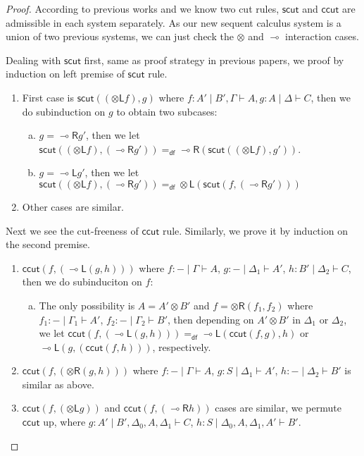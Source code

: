 \documentclass{article}
\newtheorem*{proof}{Proof : }
\newcommand{\tl}{\otimes \mathsf{L}}
\newcommand{\tr}{\otimes \mathsf{R}}
\newcommand{\lright}{\multimap \mathsf{R}}
\newcommand{\lleft}{\multimap \mathsf{L}}
\newcommand{\ot}{\otimes}
\newcommand{\lolli}{\multimap}
\newcommand{\defeq}{=_{\mathsf{df}}}
\begin{document}
\begin{proof}
  According to previous works \cite{uustalu_sequent_2018} and \cite{uustalu_deductive_nodate} we know two cut rules, $\mathsf{scut}$ and $\mathsf{ccut}$ are admissible in each system separately.
  As our new sequent calculus system is a union of two previous systems, we can just check the $\ot$ and $\lolli$ interaction cases.

  Dealing with $\mathsf{scut}$ first, same as proof strategy in previous papers, we proof by induction on left premise of $\mathsf{scut}$ rule.
  \begin{enumerate}[1. ]
    \item First case is $\mathsf{scut} ((\tl f), g)$ where $f : A' \mid B' , \Gamma \vdash A, g : A \mid \Delta \vdash C$, then we do subinduction on $g$ to obtain two subcases:
          \begin{enumerate}[a. ]
            \item $g = \lright g'$, then we let $\mathsf{scut} ((\tl f), (\lright g')) \defeq \lright (\mathsf{scut} ((\tl f), g'))$.
            \item $g = \lleft g'$, then we let $\mathsf{scut} ((\tl f), (\lright g')) \defeq \tl (\mathsf{scut} (f, (\lright g')))$
          \end{enumerate}
    \item Other cases are similar.
  \end{enumerate}
  Next we see the cut-freeness of $\mathsf{ccut}$ rule.
  Similarly, we prove it by induction on the second premise.
  \begin{enumerate}[1. ]
    \item $\mathsf{ccut} (f , (\lleft (g, h)))$ where $f : - \mid \Gamma \vdash A$, $g : - \mid \Delta_1 \vdash A'$, $h : B' \mid \Delta_2 \vdash C$, then we do subinduciton on $f$:
    \begin{enumerate}[a. ]
      \item The only possibility is $A = A' \ot B'$ and $f = \tr (f_1, f_2)$ where $f_1 : - \mid \Gamma_1 \vdash A'$, $f_2 : - \mid \Gamma_2 \vdash B'$, then depending on $A' \ot B'$ in $\Delta_1$ or $\Delta_2$,
      we let $\mathsf{ccut} (f , (\lleft (g, h))) \defeq \lleft (\mathsf{ccut} (f, g), h)$ or $ \lleft (g, (\mathsf{ccut} (f, h)))$, respectively.
    \end{enumerate}
    \item $\mathsf{ccut} (f , (\tr (g, h)))$ where $f : - \mid \Gamma \vdash A$, $g : S \mid \Delta_1 \vdash A'$, $h : - \mid \Delta_2 \vdash B'$ is similar as above.
    \item $\mathsf{ccut} (f, (\tl g))$ and
    $\mathsf{ccut} (f, (\lright h))$ cases are similar, we permute $\mathsf{ccut}$ up,
    where $g : A' \mid B' , \Delta_0 , A , \Delta_1 \vdash C$, $h : S \mid \Delta_0 , A , \Delta_1 , A' \vdash B'$.
  \end{enumerate}
\end{proof}
\end{document}
